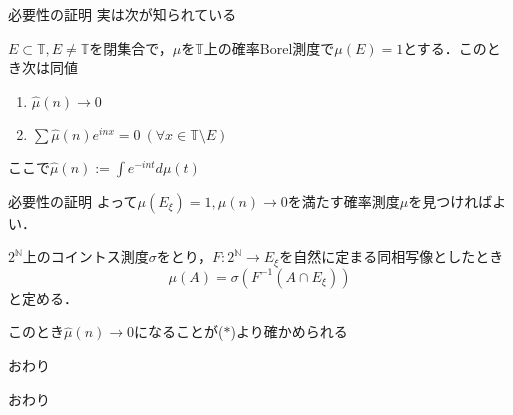 \documentclass[dvipdfmx,17pt]{beamer}
\theoremstyle{plain}
\newcommand{\N}{\mathbb{N}}
\begin{document}
\begin{frame}{必要性の証明}
実は次が知られている

\vspace{0.5cm}
$E \subset \mathbb{T}, E \ne \mathbb{T}$を閉集合で，$\mu$を$\mathbb{T}$上の確率Borel測度で$\mu(E) = 1$とする．このとき次は同値
\begin{enumerate}
\item $\hat{\mu}(n) \to 0$
\item $\sum \hat{\mu}(n) e^{inx} = 0\ (\forall x \in \mathbb{T} \setminus E)$
\end{enumerate}
ここで$\hat{\mu}(n) := \int e^{-int} d\mu(t)$
\end{frame}

\begin{frame}{必要性の証明}
よって$\mu(E_\xi) = 1, \hat{\mu}(n) \to 0$を満たす確率測度$\mu$を見つければよい．
	
$2^{\N}$上のコイントス測度$\sigma$をとり，$F: 2^{\N} \to E_\xi$を自然に定まる同相写像としたとき
\[\mu(A) = \sigma(F^{-1}(A \cap E_\xi))\]
と定める．

このとき$\hat{\mu}(n) \to 0$になることが($\ast$)より確かめられる
\end{frame}

\begin{frame}{おわり}
\begin{center}おわり\end{center}
\end{frame}
\end{document}
